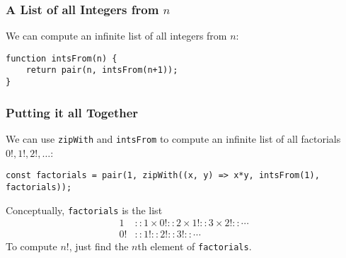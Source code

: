 \documentclass[12pt]{beamer}
\begin{document}
\begin{frame}[fragile]
\frametitle{A List of all Integers from $n$}
We can compute an infinite list of all integers from $n$:
\begin{lstlisting}
function intsFrom(n) {
	return pair(n, intsFrom(n+1));
}
\end{lstlisting}
\end{frame}

\begin{frame}[fragile]
\frametitle{Putting it all Together}
We can use \texttt{zipWith} and \texttt{intsFrom} to compute an infinite list of all factorials $0!, 1!, 2!,\ldots$:
\begin{lstlisting}
const factorials = pair(1, zipWith((x, y) => x*y, intsFrom(1), factorials));
\end{lstlisting}\pause
Conceptually, \texttt{factorials} is the list
\begin{align*}
1 &:: 1 \times 0! :: 2 \times 1! :: 3 \times 2! :: \cdots \\
0! &:: 1! :: 2! :: 3! :: \cdots
\end{align*}
To compute $n!$, just find the $n$th element of \texttt{factorials}.
\end{frame}
\end{document}

